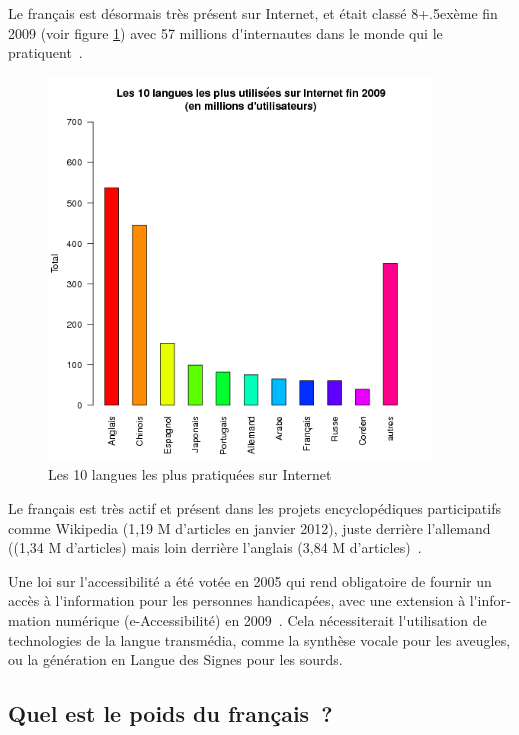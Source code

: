 \begin{french}
\begin{multicols}{2}
Le français est désormais très présent sur Internet, et était classé
8\raise+.5ex\hbox{ème} fin 2009 (voir figure \ref{fig:internettop10})
avec 57 millions d{\mbox '}internautes dans le monde qui le pratiquent~\cite{internettop10}.
%
\begin{figure}[t]
\begin{center}
 \includegraphics[height=4.0in]{_media/french/french_pix2_top_10_Internet_languages_2010.png}
  \caption{Les 10 langues les plus pratiquées sur Internet~\cite{internettop10}}
  \label{fig:internettop10}
\end{center}
\end{figure}

Le français est très actif et présent dans les projets encyclopédiques participatifs comme Wikipedia (1,19 M d'articles en janvier 2012), juste derrière l'allemand ((1,34 M d'articles) mais loin derrière l'anglais (3,84 M d'articles)~\cite{wikipediastats}.

Une loi sur l{\mbox '}accessibilité a été votée en 2005 qui rend
obligatoire de fournir un accès à l{\mbox '}information pour les
personnes handicapées, avec une extension à l{\mbox '}information
numérique (e-Accessibilité) en 2009~\cite{loi}. Cela nécessiterait
l{\mbox '}utilisation de technologies de la langue transmédia, comme
la synthèse vocale pour les aveugles, ou la génération en Langue des
Signes pour les sourds.

\subsection{Quel est le poids du français~?}


\end{multicols}
\end{french}
